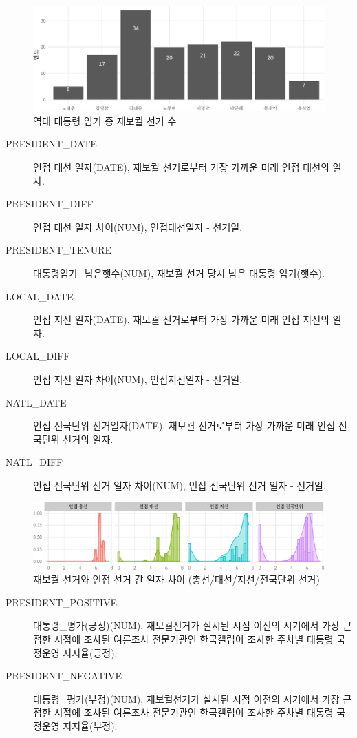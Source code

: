 \documentclass[
  11pt,
  letter]{article}
\begin{document}
\begin{figure}
\centering
\includegraphics{Codebook_national_files/figure-latex/unnamed-chunk-18-1.pdf}
\caption{역대 대통령 임기 중 재보궐 선거 수}
\end{figure}

\begin{description}
\item[PRESIDENT\_DATE]
인접 대선 일자(DATE), 재보궐 선거로부터 가장 가까운 미래 인접 대선의
일자.
\item[PRESIDENT\_DIFF]
인접 대선 일자 차이(NUM), 인접대선일자 - 선거일.
\item[PRESIDENT\_TENURE]
대통령임기\_남은햇수(NUM), 재보궐 선거 당시 남은 대통령 임기(햇수).
\item[LOCAL\_DATE]
인접 지선 일자(DATE), 재보궐 선거로부터 가장 가까운 미래 인접 지선의
일자.
\item[LOCAL\_DIFF]
인접 지선 일자 차이(NUM), 인접지선일자 - 선거일.
\item[NATL\_DATE]
인접 전국단위 선거일자(DATE), 재보궐 선거로부터 가장 가까운 미래 인접
전국단위 선거의 일자.
\item[NATL\_DIFF]
인접 전국단위 선거 일자 차이(NUM), 인접 전국단위 선거 일자 - 선거일.
\end{description}

\begin{figure}
\centering
\includegraphics{Codebook_national_files/figure-latex/unnamed-chunk-19-1.pdf}
\caption{재보궐 선거와 인접 선거 간 일자 차이 (총선/대선/지선/전국단위
선거)}
\end{figure}

\newpage

\begin{description}
\item[PRESIDENT\_POSITIVE]
대통령\_평가(긍정)(NUM), 재보궐선거가 실시된 시점 이전의 시기에서 가장
근접한 시점에 조사된 여론조사 전문기관인 한국갤럽이 조사한 주차별 대통령
국정운영 지지율(긍정).
\item[PRESIDENT\_NEGATIVE]
대통령\_평가(부정)(NUM), 재보궐선거가 실시된 시점 이전의 시기에서 가장
근접한 시점에 조사된 여론조사 전문기관인 한국갤럽이 조사한 주차별 대통령
국정운영 지지율(부정).
\end{description}
\end{document}
